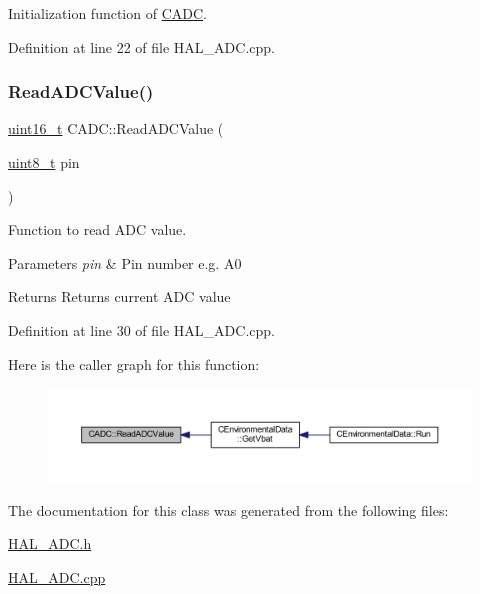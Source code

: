 Initialization function of \mbox{\hyperlink{class_c_a_d_c}{C\+A\+DC}}. 



Definition at line 22 of file H\+A\+L\+\_\+\+A\+D\+C.\+cpp.

\mbox{\label{class_c_a_d_c_ac2f897fc64f605751ac3ffe7d2704ba6}} 
\subsubsection{\texorpdfstring{Read\+A\+D\+C\+Value()}{ReadADCValue()}}
{\footnotesize\ttfamily \mbox{\hyperlink{_a_d_a_s___types_8h_a1f1825b69244eb3ad2c7165ddc99c956}{uint16\+\_\+t}} C\+A\+D\+C\+::\+Read\+A\+D\+C\+Value (\begin{DoxyParamCaption}\item[{\mbox{\hyperlink{_a_d_a_s___types_8h_aba7bc1797add20fe3efdf37ced1182c5}{uint8\+\_\+t}}}]{pin }\end{DoxyParamCaption})}



Function to read A\+DC value. 


\begin{DoxyParams}{Parameters}
{\em pin} & Pin number e.\+g. A0 \\
\hline
\end{DoxyParams}
\begin{DoxyReturn}{Returns}
Returns current A\+DC value 
\end{DoxyReturn}


Definition at line 30 of file H\+A\+L\+\_\+\+A\+D\+C.\+cpp.

Here is the caller graph for this function\+:
\nopagebreak
\begin{figure}[H]
\begin{center}
\leavevmode
\includegraphics[width=350pt]{class_c_a_d_c_ac2f897fc64f605751ac3ffe7d2704ba6_icgraph}
\end{center}
\end{figure}


The documentation for this class was generated from the following files\+:\begin{DoxyCompactItemize}
\item 
\mbox{\hyperlink{_h_a_l___a_d_c_8h}{H\+A\+L\+\_\+\+A\+D\+C.\+h}}\item 
\mbox{\hyperlink{_h_a_l___a_d_c_8cpp}{H\+A\+L\+\_\+\+A\+D\+C.\+cpp}}\end{DoxyCompactItemize}
